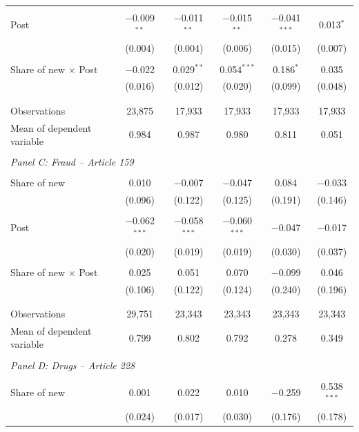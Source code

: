 \documentclass[12pt]{article}
\numberwithin{equation}{section}
\numberwithin{table}{section}
\numberwithin{figure}{section}
\begin{document}
\begin{table}[!htbp]
\begin{threeparttable}
\begin{tabular}{@{\extracolsep{5pt}}lccccc}
  & & & & & \\ 
 Post & $-$0.009$^{**}$ & $-$0.011$^{**}$ & $-$0.015$^{**}$ & $-$0.041$^{***}$ & 0.013$^{*}$ \\ 
  & (0.004) & (0.004) & (0.006) & (0.015) & (0.007) \\ 
  & & & & & \\ 
  Share of new $\times$ Post& $-$0.022 & 0.029$^{**}$ & 0.054$^{***}$ & 0.186$^{*}$ & 0.035 \\ 
  & (0.016) & (0.012) & (0.020) & (0.099) & (0.048) \\ 
  & & & & & \\[-1.8ex]  
  \hline\\[-1.8ex] 
Observations & 23,875 & 17,933 & 17,933 & 17,933 & 17,933 \\ 
Mean of dependent variable&0.984& 0.987& 0.980 &0.811 &0.051\\ 
\hline \\[-1.8ex] 
\multicolumn{6}{l}{\textit{Panel C: Fraud -- Article 159}}\\[-1.8ex] \\
Share of new  & 0.010 & $-$0.007 & $-$0.047 & 0.084 & $-$0.033 \\ 
& (0.096) & (0.122) & (0.125) & (0.191) & (0.146) \\ 
& & & & & \\ 
Post & $-$0.062$^{***}$ & $-$0.058$^{***}$ & $-$0.060$^{***}$ & $-$0.047 & $-$0.017 \\ 
& (0.020) & (0.019) & (0.019) & (0.030) & (0.037) \\ 
& & & & & \\ 
Share of new $\times$ Post & 0.025 & 0.051 & 0.070 & $-$0.099 & 0.046 \\ 
& (0.106) & (0.122) & (0.124) & (0.240) & (0.196) \\ 
& & & & & \\[-1.8ex]  
\hline \\[-1.8ex] 
Observations & 29,751 & 23,343 & 23,343 & 23,343 & 23,343 \\ 
Mean of dependent variable &0.799& 0.802& 0.792 &0.278 &0.349 \\ 
\hline \\[-1.8ex] 
\multicolumn{6}{l}{\textit{Panel D: Drugs -- Article 228}}\\[-1.8ex] \\
Share of new & 0.001 & 0.022 & 0.010 & $-$0.259 & 0.538$^{***}$ \\ 
& (0.024) & (0.017) & (0.030) & (0.176) & (0.178) \\ 

\end{tabular}
\end{threeparttable}
\end{table}
\end{document}
